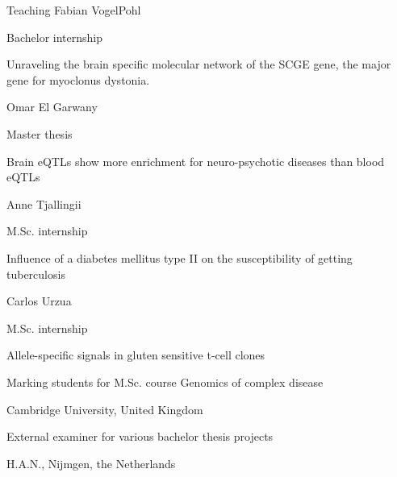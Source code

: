 \begin{rubric}{Teaching}
%
Fabian VogelPohl \par
Bachelor internship \par
Unraveling the brain specific molecular network of the SCGE gene, the major gene for myoclonus dystonia. 

%
Omar El Garwany \par
Master thesis \par
Brain eQTLs show more enrichment for neuro-psychotic diseases than blood eQTLs

%
Anne Tjallingii \par
M.Sc. internship \par
Influence of a diabetes mellitus type II on the susceptibility of getting tuberculosis

%
Carlos Urzua \par
M.Sc. internship \par
Allele-specific signals in gluten sensitive t-cell clones


\entry*[Jun 2022]%
Marking students for M.Sc. course Genomics of complex disease \par Cambridge University, United Kingdom

\entry*[Aug 2020, 2021]%
External examiner for various bachelor thesis projects \par
H.A.N., Nijmgen, the Netherlands

\end{rubric}